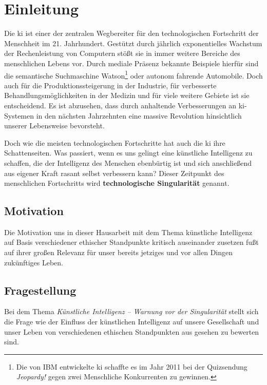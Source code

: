 \section{Einleitung}
Die \ac{ki} ist einer der zentralen Wegbereiter für den technologischen Fortschritt der Menschheit im 21. Jahrhundert.
Gestützt durch jährlich exponentielles Wachstum der Rechenleistung von Computern stößt sie in immer weitere Bereiche des menschlichen Lebens vor.
Durch mediale Präsenz bekannte Beispiele hierfür sind die semantische Suchmaschine Watson\footnote{Die von IBM entwickelte \ac{ki} schaffte es im Jahr 2011 bei der Quizsendung \textit{Jeopardy!} gegen zwei Menschliche Konkurrenten zu gewinnen.} oder autonom fahrende Automobile. %
Doch auch für die Produktionssteigerung in der Industrie, für verbesserte Behandlungsmöglichkeiten in der Medizin und für viele weitere Gebiete ist sie entscheidend.
Es ist abzusehen, dass durch anhaltende Verbesserungen an \ac{ki}-Systemen in den nächsten Jahrzehnten eine massive Revolution hinsichtlich unserer Lebensweise bevorsteht.

Doch wie die meisten technologischen Fortschritte hat auch die \ac{ki} ihre Schattenseiten.
Was passiert, wenn es uns gelingt eine künstliche Intelligenz zu schaffen, die der Intelligenz des Menschen ebenbürtig ist und sich anschließend aus eigener Kraft rasant selbst verbessern kann?
Dieser Zeitpunkt des menschlichen Fortschritts wird \textbf{technologische Singularität} genannt.

\subsection{Motivation}
Die Motivation uns in dieser Hausarbeit mit dem Thema \flqq künstliche Intelligenz\frqq{} auf Basis verschiedener ethischer Standpunkte kritisch auseinander zusetzen fußt auf ihrer großen Relevanz für unser bereits jetziges und vor allen Dingen zukünftiges Leben.

\subsection{Fragestellung}
Bei dem Thema \textit{Künstliche Intelligenz -- Warnung vor der Singularität} stellt sich die Frage wie der Einfluss der künstlichen Intelligenz auf unsere Gesellschaft und unser Leben von verschiedenen ethischen Standpunkten aus gesehen zu bewerten sind.


